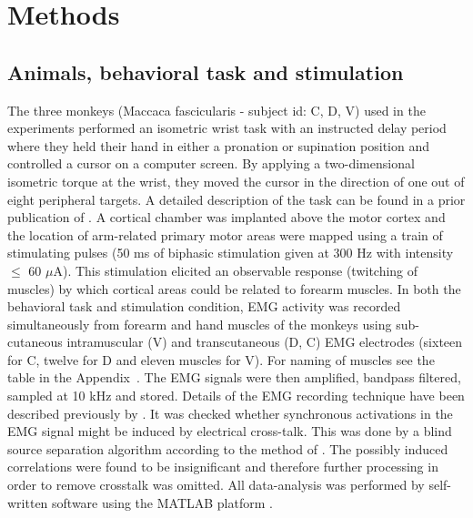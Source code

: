 \chapter{Methods} %
\label{sg:cha:methods}

% 
\section{Animals, behavioral task and stimulation} %
\label{sg:sec:animals_and_behavioral_task}

The three monkeys (Maccaca fascicularis - subject id: C, D, V) used in the experiments performed an isometric wrist task with an instructed delay period where they held their hand in either a pronation or supination position and controlled a cursor on a computer screen. By applying a two-dimensional isometric torque at the wrist, they moved the cursor in the direction of one out of eight peripheral targets. A detailed description of the task can be found in a prior publication of \citet{Yanai:2007p2455}.
A cortical chamber was implanted above the motor cortex and the location of arm-related primary motor areas were mapped using a train of stimulating pulses (50 ms of biphasic stimulation given at 300 Hz with intensity $\leq$ 60 $\mu$A). This stimulation elicited an observable response (twitching of muscles) by which cortical areas could be related to forearm muscles. 
In both the behavioral task and stimulation condition, EMG activity was recorded simultaneously from forearm and hand muscles of the monkeys using sub-cutaneous intramuscular (V) and transcutaneous (D, C) EMG electrodes (sixteen for C, twelve for D and eleven muscles for V). For naming of muscles see the table in the Appendix~. The EMG signals were then amplified, bandpass filtered, sampled at 10 kHz and stored. Details of the EMG recording technique have been described previously by \citet{Prut:2003p2780}. It was checked whether synchronous activations in the EMG signal might be induced by electrical cross-talk. This was done by a blind source separation algorithm \citep{Chan:2002p5339} according to the method of  \citet{Kilner:2002p5423}. The possibly induced correlations were found to be insignificant and therefore further processing in order to remove crosstalk was omitted. All data-analysis was performed by self-written software using the MATLAB platform \citep[see git repository of][]{synergies_code}.
